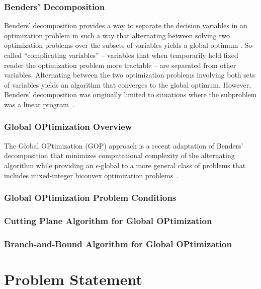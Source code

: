\documentclass[11pt]{article}
\begin{document}
\subsubsection{Benders' Decomposition}

Benders' decomposition provides a way to separate the decision variables in an optimization problem in such a way that alternating between solving two optimization problems over the subsets of variables yields a global optimum \cite{Benders1962,Geoffrion1972}. So-called ``complicating variables'' -- variables that when temporarily held fixed render the optimization problem more tractable -- are separated from other variables. 
Alternating between the two optimization problems involving both sets of variables yields an algorithm that converges to the global optimum. 
However, Benders' decomposition was originally limited to situations where the subproblem was a linear program~\cite{Benders1962}.


\subsubsection{Global OPtimization Overview}

The Global OPtimization (GOP) approach is a recent adaptation of Benders' decomposition that minimizes computational complexity of the alternating algorithm while providing an $\epsilon$-global to a more general class of problems that includes mixed-integer biconvex optimization problems~\cite{Floudas1990}. 

\subsubsection{Global OPtimization Problem Conditions}

\subsubsection{Cutting Plane Algorithm for Global OPtimization}

\subsubsection{Branch-and-Bound Algorithm for Global OPtimization}


\section{Problem Statement}\label{sec:problem} 
\end{document}
